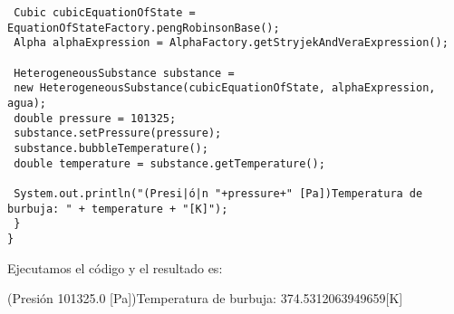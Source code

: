 \begin{enumerate}
\begin{lstlisting}
 Cubic cubicEquationOfState = EquationOfStateFactory.pengRobinsonBase();
 Alpha alphaExpression = AlphaFactory.getStryjekAndVeraExpression();
 
 HeterogeneousSubstance substance =
 new HeterogeneousSubstance(cubicEquationOfState, alphaExpression, agua);
 double pressure = 101325;
 substance.setPressure(pressure);
 substance.bubbleTemperature();
 double temperature = substance.getTemperature();
 
 System.out.println("(Presi|ó|n "+pressure+" [Pa])Temperatura de burbuja: " + temperature + "[K]");
 }
}

\end{lstlisting}
Ejecutamos el código y el resultado es:

(Presión 101325.0 [Pa])Temperatura de burbuja: 374.5312063949659[K]
\end{enumerate}